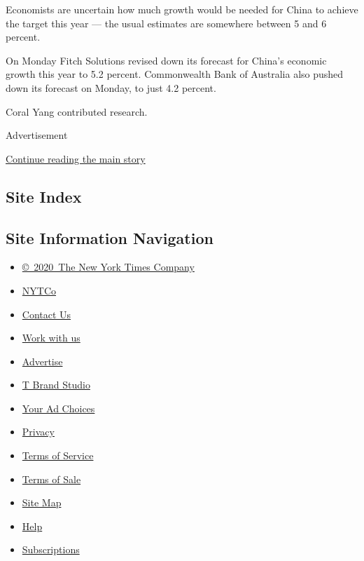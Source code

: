 Economists are uncertain how much growth would be needed for China to
achieve the target this year --- the usual estimates are somewhere
between 5 and 6 percent.

On Monday Fitch Solutions revised down its forecast for China's economic
growth this year to 5.2 percent. Commonwealth Bank of Australia also
pushed down its forecast on Monday, to just 4.2 percent.

Coral Yang contributed research.

Advertisement

\protect\hyperlink{after-bottom}{Continue reading the main story}

\hypertarget{site-index}{%
\subsection{Site Index}\label{site-index}}

\hypertarget{site-information-navigation}{%
\subsection{Site Information
Navigation}\label{site-information-navigation}}

\begin{itemize}
\tightlist
\item
  \href{https://help.nytimes.com/hc/en-us/articles/115014792127-Copyright-notice}{©~2020~The
  New York Times Company}
\end{itemize}

\begin{itemize}
\tightlist
\item
  \href{https://www.nytco.com/}{NYTCo}
\item
  \href{https://help.nytimes.com/hc/en-us/articles/115015385887-Contact-Us}{Contact
  Us}
\item
  \href{https://www.nytco.com/careers/}{Work with us}
\item
  \href{https://nytmediakit.com/}{Advertise}
\item
  \href{http://www.tbrandstudio.com/}{T Brand Studio}
\item
  \href{https://www.nytimes.com/privacy/cookie-policy\#how-do-i-manage-trackers}{Your
  Ad Choices}
\item
  \href{https://www.nytimes.com/privacy}{Privacy}
\item
  \href{https://help.nytimes.com/hc/en-us/articles/115014893428-Terms-of-service}{Terms
  of Service}
\item
  \href{https://help.nytimes.com/hc/en-us/articles/115014893968-Terms-of-sale}{Terms
  of Sale}
\item
  \href{https://spiderbites.nytimes.com}{Site Map}
\item
  \href{https://help.nytimes.com/hc/en-us}{Help}
\item
  \href{https://www.nytimes.com/subscription?campaignId=37WXW}{Subscriptions}
\end{itemize}
